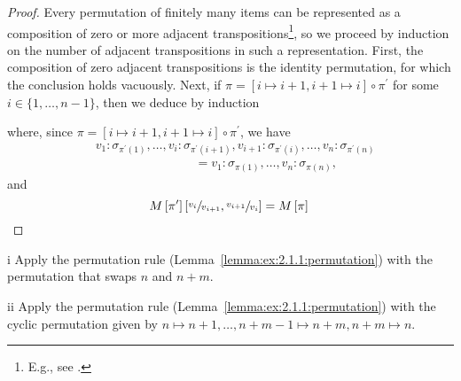 \begin{proof}
Every permutation of finitely many items can be represented as a composition of zero or more adjacent transpositions\footnote{E.g., see \cite[Chapter~I, \S5, No.~7, Proposition~9]{BourbakiAlgebraI}.}, so we proceed by induction on the number of adjacent transpositions in such a representation.
First, the composition of zero adjacent transpositions is the identity permutation, for which the conclusion holds vacuously.
Next, if \(\pi = [i \mapsto i + 1, i + 1\mapsto i] \circ \pi^\prime\) for some \(i \in \{1, \ldots, n - 1\}\), then we deduce by induction
\begin{prooftree}
\end{prooftree}
where, since \(\pi = [i \mapsto i + 1, i + 1\mapsto i] \circ \pi^\prime\), we have
\begin{align*}
&v_1 : \sigma_{\pi^\prime(1)}, \ldots, v_i : \sigma_{\pi^\prime(i+1)}, v_{i+1} : \sigma_{\pi^\prime(i)}, \ldots, v_n : \sigma_{\pi^\prime(n)} \\
&\qquad\qquad\qquad\qquad= v_1 : \sigma_{\pi(1)}, \ldots, v_n : \sigma_{\pi(n)},
\end{align*}
and
\begin{equation*}
M\left[\pi^\prime\right]\left[\sfrac{v_i}{v_{i+1}},\sfrac{v_{i+1}}{v_i}\right]
= M\left[\pi\right]
\qedhere
\end{equation*}
\end{proof}

\begin{partsolution}{i}
Apply the permutation rule (Lemma~\ref{lemma:ex:2.1.1:permutation}) with the permutation that swaps \(n\) and \(n+m\).
\end{partsolution}

\begin{partsolution}{ii}
Apply the permutation rule (Lemma~\ref{lemma:ex:2.1.1:permutation}) with the cyclic permutation
given by \(n \mapsto n + 1, \ldots, n + m - 1 \mapsto n + m, n + m \mapsto n\).
\end{partsolution}
